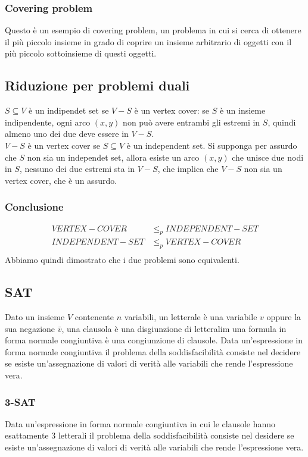 \subsubsection{Covering problem}
Questo \`e un esempio di covering problem, un problema in cui si cerca di ottenere il pi\`u piccolo insieme in grado di coprire un insieme arbitrario di oggetti con il pi\`u piccolo 
sottoinsieme di questi oggetti.
\subsection{Riduzione per problemi duali}
$S\subseteq V$ \`e un indipendet set se $V-S$ \`e un vertex cover: se $S$ \`e un insieme indipendente, ogni arco $(x, y)$ non pu\`o avere entrambi gli estremi in $S$, quindi almeno uno
dei due deve essere in $V-S$.\\
$V-S$ \`e un vertex cover se $S\subseteq V$ \`e un independent set. Si supponga per assurdo che $S$ non sia un independet set, allora esiste un arco $(x, y)$ che unisce due nodi in $S$, 
nessuno dei due estremi sta in $V-S$, che implica che $V-S$ non sia un vertex cover, che \`e un assurdo.
\subsubsection{Conclusione}
\begin{align*}
	VERTEX-COVER &\le_p INDEPENDENT-SET\\
	INDEPENDENT-SET &\le_p VERTEX-COVER\\
\end{align*}
Abbiamo quindi dimostrato che i due problemi sono equivalenti.
\subsection{SAT}
Dato un insieme $V$ contenente $n$ variabili, un letterale \`e una variabile $v$ oppure la sua negazione $\bar{v}$, una clausola \`e una disgiunzione di letteralim una formula in forma
normale congiuntiva \`e una congiunzione di clausole. Data un'espressione in forma normale congiuntiva il problema della soddisfacibilit\`a consiste nel decidere se esiste 
un'assegnazione di valori di verit\`a alle variabili che rende l'espressione vera.
\subsubsection{3-SAT}
Data un'espressione in forma normale congiuntiva in cui le clausole hanno esattamente $3$ letterali il problema della soddisfacibilit\`a consiste nel desidere se esiste un'assegnazione
di valori di verit\`a alle variabili che rende l'espressione vera.
